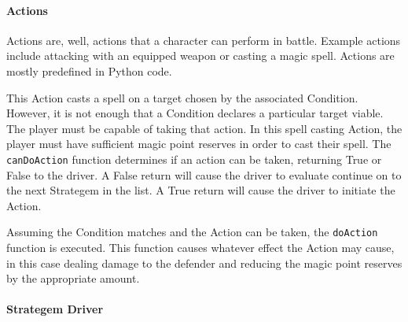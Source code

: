 \documentclass[11pt]{article}
\begin{document}
\paragraph{Actions} \hfill %

Actions are, well, actions that a character can perform in battle.  Example actions include attacking with an equipped weapon or casting a magic spell.  Actions are mostly predefined in Python code.  

\singlespacing
{}
\doublespacing

This Action casts a spell on a target chosen by the associated Condition.  However, it is not enough that a Condition declares a particular target viable.  The player must be capable of taking that action. In this spell casting Action, the player must have sufficient magic point reserves in order to cast their spell.  The \texttt{canDoAction} function determines if an action can be taken, returning True or False to the driver.  A False return will cause the driver to evaluate continue on to the next Strategem in the list.  A True return will cause the driver to initiate the Action.

Assuming the Condition matches and the Action can be taken, the \texttt{doAction} function is executed.  This function causes whatever effect the Action may cause, in this case dealing damage to the defender and reducing the magic point reserves by the appropriate amount.  

\paragraph{Strategem Driver} \hfill
\end{document}
